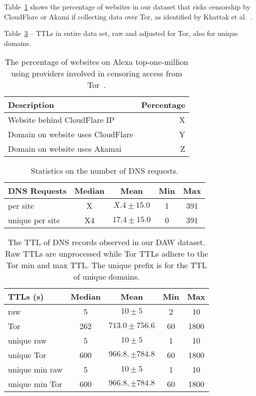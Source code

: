 Table~\ref{tab:dns-censor} shows the percentage of websites in our dataset that
risks censorship by CloudFlare or Akami if collecting data over Tor, as
identified by Khattak et al.~\cite{Khattak2016a}.

Table~\ref{tab:daw-ttls} -- TTLs in entire data set, raw and adjusted for Tor,
also for unique domains.

\begin{table}[t]
	\centering
	\begin{tabular}{l r}
	\toprule
	\textbf{Description} & \textbf{Percentage} \\
	\midrule
	Website behind CloudFlare IP & X \\
	Domain on website uses CloudFlare & Y \\
	Domain on website uses Akamai & Z \\
	\bottomrule
	\end{tabular}
	\caption{The percentage of websites on Alexa top-one-million using providers
	involved in censoring access from Tor~\cite{Khattak2016a}.}
	\label{tab:dns-censor}
\end{table}

\begin{table}[t]
	\centering
	\begin{tabular}{l c c c c}
	\toprule
	\textbf{DNS Requests} & \textbf{Median} & \textbf{Mean} & \textbf{Min} & \textbf{Max} \\
	\midrule
	per site & X & $X.4\pm15.0$ & 1 & 391 \\
	unique per site & X4 & $17.4\pm15.0$ & 0 & 391 \\
	\bottomrule
	\end{tabular}
	\caption{Statistics on the number of DNS requests.}
	\label{tab:daw-unique}
\end{table}


\begin{table}[t]
	\centering
	\begin{tabular}{l c c c c}
	\toprule
	\textbf{TTLs (s)} & \textbf{Median} & \textbf{Mean} & \textbf{Min} & \textbf{Max} \\
	\midrule
	raw & 5 & $10 \pm 5$ & 2 & 10 \\
	Tor & 262 & $713.0 \pm 756.6$ & 60 & 1800 \\
	unique raw & 5 & $10 \pm 5$ & 1 & 10 \\
	unique Tor & 600 & $966.8, \pm 784.8$ & 60 & 1800 \\
	unique min raw & 5 & $10 \pm 5$ & 1 & 10 \\
	unique min Tor & 600 & $966.8, \pm 784.8$ & 60 & 1800 \\
	\bottomrule
	\end{tabular}
	\caption{The TTL of DNS records observed in our DAW dataset.
	Raw TTLs are unprocessed while Tor TTLs adhere to the Tor min and max TTL.
	The unique prefix is for the TTL of unique domains.}
	\label{tab:daw-ttls}
\end{table}


